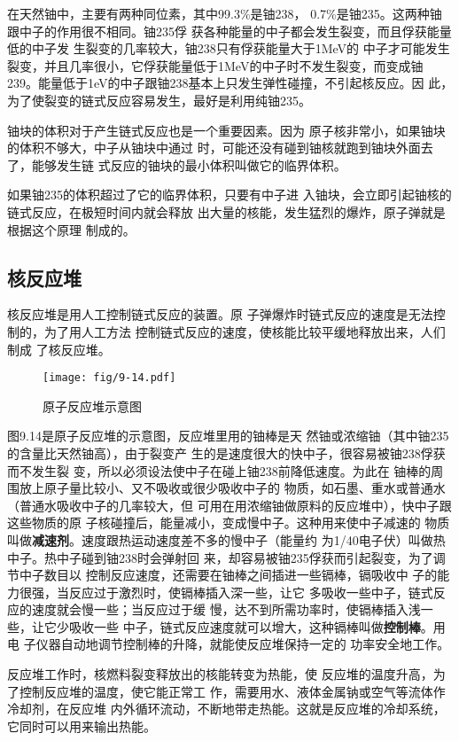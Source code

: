 在天然铀中，主要有两种同位素，其中99.3\%是铀238，
0.7\%是铀235。这两种铀跟中子的作用很不相同。铀235俘
获各种能量的中子都会发生裂变，而且俘获能量低的中子发
生裂变的几率较大，铀238只有俘获能量大于1MeV的
中子才可能发生裂变，并且几率很小，它俘获能量低于1MeV的中子时不发生裂变，而变成铀239。能量低于1eV的中子跟铀238基本上只发生弹性碰撞，不引起核反应。因
此，为了使裂变的链式反应容易发生，最好是利用纯铀235。

铀块的体积对于产生链式反应也是一个重要因素。因为
原子核非常小，如果铀块的体积不够大，中子从铀块中通过
时，可能还没有碰到铀核就跑到铀块外面去了，能够发生链
式反应的铀块的最小体积叫做它的临界体积。

如果铀235的体积超过了它的临界体积，只要有中子进
入铀块，会立即引起铀核的链式反应，在极短时间内就会释放
出大量的核能，发生猛烈的爆炸，原子弹就是根据这个原理
制成的。

\subsection{核反应堆}

核反应堆是用人工控制链式反应的装置。原
子弹爆炸时链式反应的速度是无法控制的，为了用人工方法
控制链式反应的速度，使核能比较平缓地释放出来，人们制成
了核反应堆。
\begin{figure}[htp]
    \centering
    \texttt{[image: fig/9-14.pdf]}
    \caption{原子反应堆示意图}
\end{figure}

图9.14是原子反应堆的示意图，反应堆里用的铀棒是天
然铀或浓缩铀（其中铀235的含量比天然铀高），由于裂变产
生的是速度很大的快中子，很容易被铀238俘获而不发生裂
变，所以必须设法使中子在碰上铀238前降低速度。为此在
铀棒的周围放上原子量比较小、又不吸收或很少吸收中子的
物质，如石墨、重水或普通水（普通水吸收中子的几率较大，但
可用在用浓缩铀做原料的反应堆中），快中子跟这些物质的原
子核碰撞后，能量减小，变成慢中子。这种用来使中子减速的
物质叫做\textbf{减速剂}。速度跟热运动速度差不多的慢中子（能量约
为1/40电子伏）叫做热中子。热中子碰到铀238时会弹射回
来，却容易被铀235俘获而引起裂变，为了调节中子数目以
控制反应速度，还需要在铀棒之间插进一些镉棒，镉吸收中
子的能力很强，当反应过于激烈时，使镉棒插入深一些，让它
多吸收一些中子，链式反应的速度就会慢一些；当反应过于缓
慢，达不到所需功率时，使镉棒插入浅一些，让它少吸收一些
中子，链式反应速度就可以增大，这种镉棒叫做\textbf{控制棒}。用电
子仪器自动地调节控制棒的升降，就能使反应堆保持一定的
功率安全地工作。

反应堆工作时，核燃料裂变释放出的核能转变为热能，使
反应堆的温度升高，为了控制反应堆的温度，使它能正常工
作，需要用水、液体金属钠或空气等流体作冷却剂，在反应堆
内外循环流动，不断地带走热能。这就是反应堆的冷却系统，
它同时可以用来输出热能。

